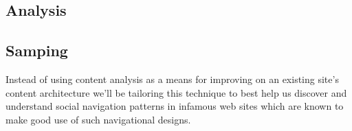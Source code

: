 \subsection{Analysis}

\subsection{Samping}


Instead of using content analysis as a means for improving on an existing
site's content architecture we'll be tailoring this technique to best help us
discover and understand social navigation patterns in infamous web sites which
are known to make good use of such navigational designs.

